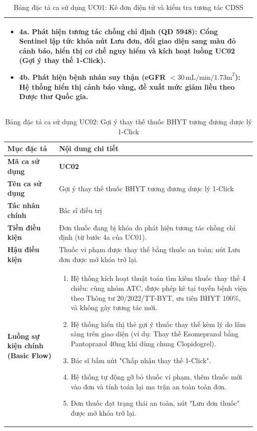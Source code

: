\begin{table}[htbp]
\begin{tabularx}{\textwidth}{L{3.2cm} Y}
\begin{itemize}[leftmargin=1.2em, topsep=0pt, partopsep=0pt]
    \item \textbf{4a. Phát hiện tương tác chống chỉ định (QĐ 5948):} Cổng Sentinel lập tức khóa nút Lưu đơn, đổi giao diện sang màu đỏ cảnh báo, hiển thị cơ chế nguy hiểm và kích hoạt luồng UC02 (Gợi ý thay thế 1-Click).
    \item \textbf{4b. Phát hiện bệnh nhân suy thận (eGFR $< 30\,\text{mL/min/1.73m}^2$):} Hệ thống hiển thị cảnh báo vàng, đề xuất mức giảm liều theo Dược thư Quốc gia.
\end{itemize} \\
\bottomrule
\end{tabularx}
\caption{Bảng đặc tả ca sử dụng UC01: Kê đơn điện tử và kiểm tra tương tác CDSS}
\label{tab:uc01_spec}
\end{table}

\begin{table}[htbp]
\centering
\small
\begin{tabularx}{\textwidth}{L{3.2cm} Y}
\toprule
\textbf{Mục đặc tả} & \textbf{Nội dung chi tiết} \\
\midrule
\textbf{Mã ca sử dụng} & \textbf{UC02} \\
\textbf{Tên ca sử dụng} & Gợi ý thay thế thuốc BHYT tương đương dược lý 1-Click \\
\textbf{Tác nhân chính} & Bác sĩ điều trị \\
\textbf{Tiền điều kiện} & Đơn thuốc đang bị khóa do phát hiện tương tác chống chỉ định (từ bước 4a của UC01). \\
\textbf{Hậu điều kiện} & Thuốc vi phạm được thay thế bằng thuốc an toàn; nút Lưu đơn được mở khóa trở lại. \\
\midrule
\textbf{Luồng sự kiện chính (Basic Flow)} & 
\begin{enumerate}[leftmargin=1.2em, topsep=0pt, partopsep=0pt]
    \item Hệ thống kích hoạt thuật toán tìm kiếm thuốc thay thế 4 chiều: cùng nhóm ATC, được phép kê tại tuyến bệnh viện theo Thông tư 20/2022/TT-BYT, ưu tiên BHYT 100\%, và không gây tương tác mới.
    \item Hệ thống hiển thị thẻ gợi ý thuốc thay thế kèm lý do lâm sàng trên giao diện (ví dụ: Thay thế Esomeprazol bằng Pantoprazol 40mg khi dùng chung Clopidogrel).
    \item Bác sĩ bấm nút "Chấp nhận thay thế 1-Click".
    \item Hệ thống tự động gỡ bỏ thuốc vi phạm, thêm thuốc mới vào đơn và tính toán lại ma trận an toàn toàn đơn.
    \item Đơn thuốc đạt trạng thái an toàn, nút "Lưu đơn thuốc" được mở khóa trở lại.
\end{enumerate} \\
\bottomrule
\end{tabularx}
\caption{Bảng đặc tả ca sử dụng UC02: Gợi ý thay thế thuốc BHYT tương đương dược lý 1-Click}
\label{tab:uc02_spec}
\end{table}


